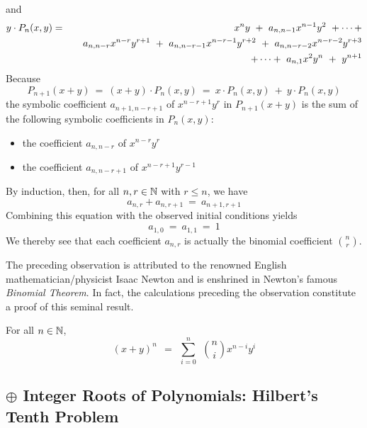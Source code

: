 and
\begin{eqnarray}
\nonumber
y \cdot P_n(x,y) & = &
 x^n y \ + \ a_{n,n-1} x^{n-1} y^2 \ + \cdots + \\
\nonumber
         &   & \hspace*{.15in}
a_{n,n-r} x^{n-r} y^{r+1} \ + \ a_{n,n-r-1} x^{n-r-1} y^{r+2}
\ + \ a_{n,n-r-2} x^{n-r-2} y^{r+3} \\
\label{eq:yPk}
         &   & \hspace*{.15in}
+ \cdots  + \ a_{n,1} x^2 y^n \ + \ y^{n+1}
\end{eqnarray}
Because
\[ P_{n+1}(x+y) \ = \ (x+y) \cdot P_n(x,y) \ = \ x \cdot P_n(x,y) \ + \ y \cdot P_n(x,y) \]
the symbolic coefficient $a_{n+1,n-r+1}$ of $x^{n-r+1} y^r$ in $P_{n+1}(x+y)$ is the sum of the following symbolic coefficients in $P_n(x,y)$:
\begin{itemize}
\item
the coefficient $a_{n,n-r}$ of $x^{n-r}y^r$
\medskip\item
the coefficient $a_{n,n-r+1}$ of $x^{n-r+1}y^{r-1}$
\end{itemize}
By induction, then, for all $n,r \in \mathbb{N}$ with $r \leq n$, we have
\[ a_{n,r} + a_{n,r+1} \ = \ a_{n+1,r+1} \]
Combining this equation with the observed initial conditions yields
\[ a_{1,0} \ = \ a_{1,1} \ = \ 1 \]
We thereby see that each coefficient $a_{n,r}$ is actually the binomial coefficient $\displaystyle {n \choose r}$.

\smallskip

 
The preceding observation is attributed to the renowned English mathematician/physicist Isaac Newton and is enshrined in Newton's famous {\it Binomial Theorem}.  In fact, the calculations preceding the observation constitute a proof of this seminal result.

\begin{theorem}
\label{thm:Binomial-theorem}
For all $n \in \mathbb{N}$,
\begin{equation}
\label{eq:binomial-theorem}
(x+y)^n \ \ = \ \ \sum_{i=0}^n \ \ {n \choose i} x^{n-i} y^i
\end{equation}
\end{theorem}


\subsection{$\oplus$ Integer Roots of Polynomials: Hilbert's Tenth Problem}
\label{sec:Hilberts-Tenth}

